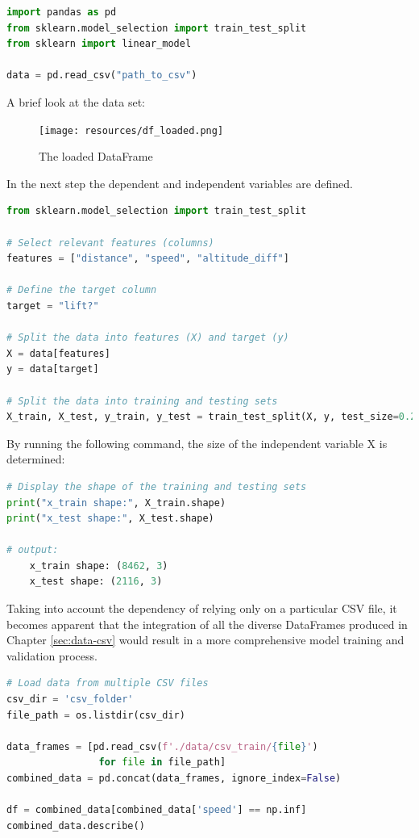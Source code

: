 \begin{lstlisting}[language=Python]
import pandas as pd
from sklearn.model_selection import train_test_split
from sklearn import linear_model

data = pd.read_csv("path_to_csv")
\end{lstlisting}

A brief look at the data set:
\begin{figure}[htb]
	\texttt{[image: resources/df\_loaded.png]}
	\caption{The loaded DataFrame}
	\label{fig:df}
\end{figure}

In the next step the dependent and independent variables are defined.

\begin{lstlisting}[language=Python]
from sklearn.model_selection import train_test_split

# Select relevant features (columns)
features = ["distance", "speed", "altitude_diff"]

# Define the target column
target = "lift?"

# Split the data into features (X) and target (y)
X = data[features]
y = data[target]

# Split the data into training and testing sets
X_train, X_test, y_train, y_test = train_test_split(X, y, test_size=0.2, random_state=42)
\end{lstlisting}

By running the following command, the size of the independent variable X is determined:

\begin{lstlisting}[language=Python]
# Display the shape of the training and testing sets
print("x_train shape:", X_train.shape)
print("x_test shape:", X_test.shape)

# output:
	x_train shape: (8462, 3)
	x_test shape: (2116, 3)
\end{lstlisting}


Taking into account the dependency of relying only on a particular CSV file, it becomes apparent that the integration of all the diverse DataFrames produced in Chapter \ref{sec:data-csv} would result in a more comprehensive model training and validation process.

\begin{lstlisting}[language=Python]
# Load data from multiple CSV files
csv_dir = 'csv_folder'
file_path = os.listdir(csv_dir)

data_frames = [pd.read_csv(f'./data/csv_train/{file}')
                for file in file_path]
combined_data = pd.concat(data_frames, ignore_index=False)

df = combined_data[combined_data['speed'] == np.inf]
combined_data.describe()
\end{lstlisting}

